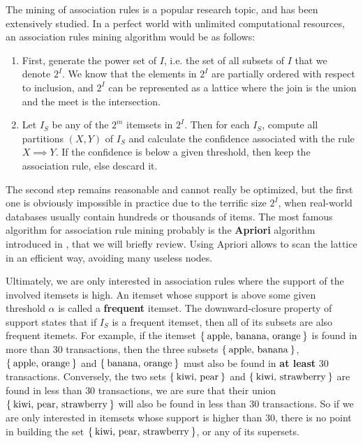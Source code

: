 The mining of association rules is a popular research topic, and has been
extensively studied. In a perfect world with unlimited computational resources,
an association rules mining algorithm would be as follows:
\begin{enumerate}
\item First, generate the power set of $I$, i.e. the set of all subsets of $I$
  that we denote $2^I$.  We know that the elements in $2^I$ are partially
  ordered with respect to inclusion, and $2^I$ can be represented as a lattice
  where the join is the union and the meet is the intersection.
\item Let $I_S$ be any of the $2^m$ itemsets in $2^I$. Then for each $I_S$,
  compute all partitions $(X, Y)$ of $I_S$ and calculate the confidence
    associated with the rule $X \implies Y$. If the confidence is below a given
    threshold, then keep the association rule, else descard it.
\end{enumerate}

The second step remains reasonable and cannot really be optimized, but the
first one is obviously impossible in practice due to the terrific size $2^I$,
when real-world databases usually contain hundreds or thousands of items.
The most famous algorithm for association rule mining probably is the
\textbf{Apriori} algorithm introduced in \cite{AgrSriVLDB94}, that we will
briefly review. Using Apriori allows to scan the lattice in an efficient way,
avoiding many useless nodes.

Ultimately, we are only interested in association rules where the support of
the involved itemsets is high. An itemset whose support is above some given
threshold $\alpha$ is called a \textbf{frequent} itemset. The downward-closure
property of support states that if $I_S$ is a frequent itemset, then all of its
subsets are also frequent itemets. For example, if the itemset
$\Set{\text{apple, banana, orange}}$ is found in more than 30 transactions,
then the three subsets $\Set{\text{apple, banana}}$, $\Set{\text{apple,
orange}}$ and $\Set{\text{banana, orange}}$ must also be found in \textbf{at
least} 30 transactions. Conversely, the two sets $\Set{\text{kiwi, pear}}$ and
$\Set{\text{kiwi, strawberry}}$ are found in less than $30$ transactions, we
are sure that their union $\Set{\text{kiwi, pear, strawberry}}$ will also be
found in less than $30$ transactions. So if we are only interested in itemsets
whose support is higher than $30$, there is no point in building the set
$\Set{\text{kiwi, pear, strawberry}}$, or any of its supersets.

